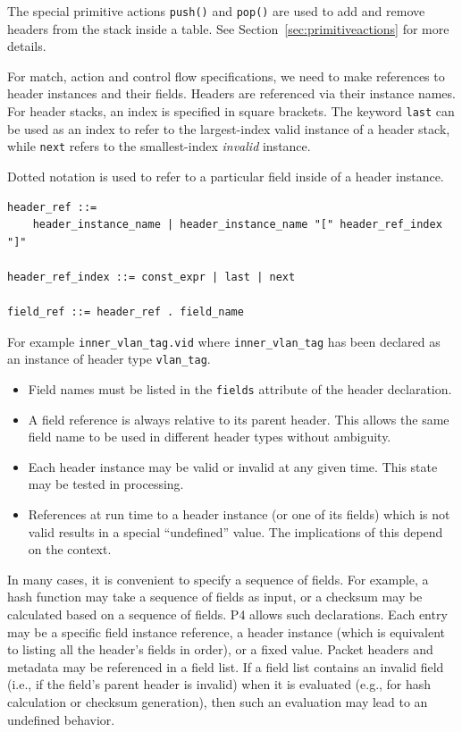 \documentclass[12pt]{article}
\begin{document}
The special primitive actions \texttt{push()} and \texttt{pop()} are used to add 
and remove headers from the stack inside a \matchaction table. See Section~\ref{sec:primitiveactions} 
for more details.


For match, action and control flow specifications, we need to make
references to header instances and their fields. Headers are
referenced via their instance names.  For header stacks, an index is
specified in square brackets. The keyword \texttt{last} can be used as an
index to refer to the largest-index valid instance of a header stack, while
\texttt{next} refers to the smallest-index \textit{invalid} instance.

Dotted notation is used to refer to a particular field inside of a header
instance. 

\begin{lstlisting}[style=BNFstyle]
header_ref ::=
    header_instance_name | header_instance_name "[" header_ref_index "]"

header_ref_index ::= const_expr | last | next

field_ref ::= header_ref . field_name
\end{lstlisting}

For example \texttt{inner_vlan_tag.vid} where
\texttt{inner_vlan_tag} has been declared as an instance of header
type \texttt{vlan_tag}.

\begin{itemize}
\item
Field names must be listed in the \texttt{fields} attribute of the
header declaration.
\item
A field reference is always relative to its parent header.  This allows the 
same field name to be used in different header types without ambiguity.
\item
Each header instance may be valid or invalid at any given time. This state 
may be tested in \matchaction processing.
\item
References at run time to a header instance (or one of its fields) which is 
not valid results in a special ``undefined'' value.  The implications of this 
depend on the context.
\end{itemize}


In many cases, it is convenient to specify a sequence of fields. For example, 
a hash function may take a sequence of fields as input, or a checksum may be 
calculated based on a sequence of fields. P4 allows such declarations. Each 
entry may be a specific field instance reference, a header instance (which 
is equivalent to listing all the header's fields in order), or a fixed value. 
Packet headers and metadata may be referenced in a field list. If a field list
contains an invalid field (i.e., if the field's parent header is invalid) when
it is evaluated (e.g., for hash calculation or checksum generation),
then such an evaluation may lead to an undefined behavior.
\end{document}
